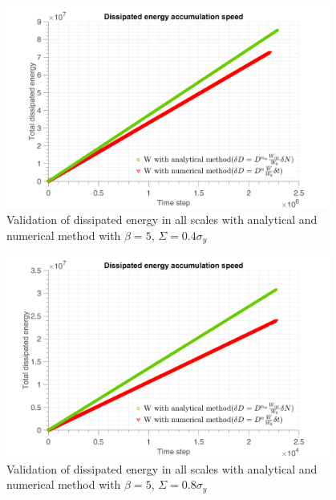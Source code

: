 \begin{figure}[!h]
	\centering
	\includegraphics[width=0.95\textwidth]{figures//W3methods_bigbeta_04y.png} 
	\caption{Validation of dissipated energy in all scales with analytical and numerical method with $\beta=5$, $\Sigma=0.4\sigma_y$ }
	\label{fig.W3methods_bigbeta_04y}
\end{figure}
\begin{figure}[!h]
	\centering
	\includegraphics[width=0.95\textwidth]{figures//W3methods_bigbeta_08y.png} 
	\caption{Validation of dissipated energy in all scales with analytical and numerical method with $\beta=5$, $\Sigma=0.8\sigma_y$ }
	\label{fig.W3methods_bigbeta_08y}
\end{figure}
